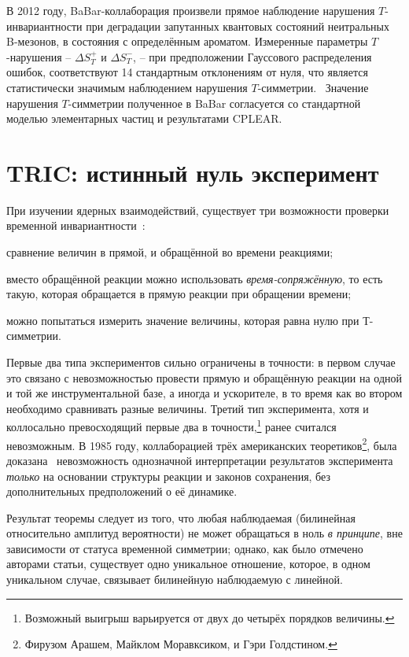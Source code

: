 \documentclass[14pt]{extarticle}
\begin{document}
В 2012 году, BaBar-коллаборация произвели прямое наблюдение нарушения $T$- инвариантности при деградации запутанных квантовых состояний неитральных B-мезонов, в состояния с определённым ароматом. Измеренные параметры $T$-нарушения -- $\Delta S_T^+$ и $\Delta S_T^-$, -- при предположении Гауссового распределения ошибок, соответствуют 14 стандартным отклонениям от нуля, что является статистически значимым наблюдением нарушения $T$-симметрии.~\cite{BaBar} Значение нарушения $T$-симметрии полученное в BaBar согласуется со стандартной моделью элементарных частиц и результатами CPLEAR.

\section{TRIC: истинный нуль эксперимент}

При изучении ядерных взаимодействий, существует три возможности проверки временной инвариантности~\cite{Goldstein}:
\begin{inparaenum}[i)]
	\item сравнение величин в прямой, и обращённой во времени реакциями;
	\item вместо обращённой реакции можно использовать \emph{время-сопряжённую}, то есть такую, которая обращается в прямую реакции при обращении времени;
	\item можно попытаться измерить значение величины, которая равна нулю при Т-симметрии.
\end{inparaenum}

Первые два типа экспериментов сильно ограничены в точности: в первом случае это связано с невозможностью провести прямую и обращённую реакции на одной и той же инструментальной базе, а иногда и ускорителе, в то время как во втором необходимо сравнивать разные величины. Третий тип эксперимента, хотя и коллосально превосходящий первые два в точности,\footnote{Возможный выигрыш варьируется от двух до четырёх порядков величины.} ранее считался невозможным. В 1985 году, коллаборацией трёх американских теоретиков\footnote{Фирузом Арашем, Майклом Моравксиком, и Гэри Голдстином.}, была доказана~\cite{Goldstein} невозможность однозначной интерпретации результатов эксперимента \emph{только} на основании структуры реакции и законов сохранения, без дополнительных предположений о её динамике. 

Результат теоремы следует из того, что любая наблюдаемая (билинейная относительно амплитуд вероятности)  не может обращаться в ноль \emph{в принципе}, вне зависимости от статуса временной симметрии; однако, как было отмечено авторами статьи, существует одно уникальное отношение, которое, в одном уникальном случае, связывает билинейную наблюдаемую с линейной. 
\end{document}
